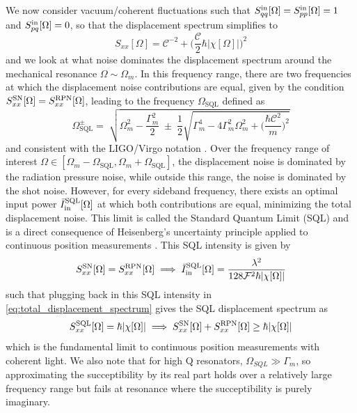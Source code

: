 We now consider vacuum/coherent fluctuations such that $S_{qq}^{\rm in}[\Omega]=S_{pp}^{\rm in}[\Omega]=1$ and $S_{pq}^{\rm in}[\Omega]=0$, so that the displacement spectrum simplifies to
\begin{equation}
  S_{xx}[\Omega] = \mathcal{C}^{-2}  + \bigg(\dfrac{\mathcal{C} }{2} \hbar |\chi[\Omega]| \bigg)^2
  \label{eq:total_displacement_spectrum}
\end{equation}
and we look at what noise dominates the displacement spectrum around the mechanical resonance $\Omega \sim \Omega_m$. In this frequency range, there are two frequencies at which the displacement noise contributions are equal, given by the condition $S_{xx}^{\rm SN}[\Omega] = S_{xx}^{\rm RPN}[\Omega]$, leading to the frequency $\Omega_{\text{SQL}}$ defined as
\begin{equation}
  \Omega^{\pm}_{\text{SQL}}  =\;\sqrt{\Omega_m^2-\dfrac{\Gamma_m^2}{2}
\;\pm\;\dfrac{1}{2}\sqrt{\Gamma_m^4-4\Gamma_m^2\Omega_m^2+\Big(\frac{\hbar \mathcal{C}^2}{m }\Big)^2}}
\end{equation}
and consistent with the LIGO/Virgo notation \cite{harry_advanced_2010, aasi_enhanced_2013}. Over the frequency range of interest $\Omega \in [\Omega_m - \Omega_{\text{SQL}}, \Omega_m + \Omega_{\text{SQL}}]$, the displacement noise is dominated by the radiation pressure noise, while outside this range, the noise is dominated by the shot noise. However, for every sideband frequency, there exists an optimal input power $\bar{I}_\mathrm{in}^{\rm SQL}[\Omega]$ at which both contributions are equal, minimizing the total displacement noise. This limit is called the Standard Quantum Limit (SQL) and is a direct consequence of Heisenberg's uncertainty principle applied to continuous position measurements \cite{braginsky_quantum_1992, clerk_introduction_2010}. This SQL intensity is given by
\begin{equation}
  S_{xx}^{\rm SN}[\Omega] = S_{xx}^{\rm RPN}[\Omega] \implies \bar{I}_\mathrm{in}^{\rm SQL}[\Omega] = \dfrac{\lambda^2}{128\mathcal{F}^2 \hbar |\chi[\Omega]|}
\end{equation}
such that plugging back in this SQL intensity in \eqref{eq:total_displacement_spectrum} gives the SQL displacement spectrum as
\begin{equation}
  S_{xx}^{\rm SQL}[\Omega] = \hbar |\chi[\Omega]| \implies S_{xx}^{\rm SN}[\Omega] + S_{xx}^{\rm RPN}[\Omega] \geq \hbar |\chi[\Omega]|
\end{equation}
which is the fundamental limit to continuous position measurements with coherent light. We also note that for high Q resonators, $\Omega_{SQL} \gg \Gamma_m$, so approximating the succeptibility by its real part holds over a relatively large frequency range but fails at resonance where the succeptibility is purely imaginary.

